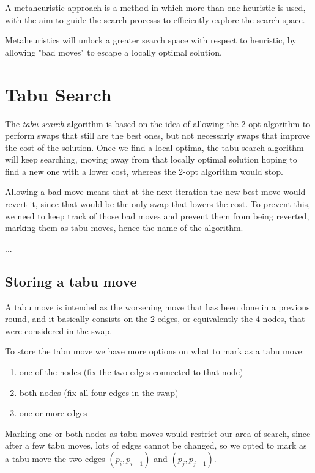 A metaheuristic approach is a method in which more than one heuristic is used, with the aim to guide the search processs to efficiently explore the search space.

Metaheuristics will unlock a greater search space with respect to heuristic, by allowing "bad moves" to escape a locally optimal solution.

\section{Tabu Search}
The \textit{tabu search} algorithm \cite{glover_tabu} is based on the idea of allowing the 2-opt algorithm to perform swaps that still are the best ones, but not necessarly swaps that improve the cost of the solution. Once we find a local optima, the tabu search algorithm will keep searching, moving away from that locally optimal solution hoping to find a new one with a lower cost, whereas the 2-opt algorithm would stop.

Allowing a bad move means that at the next iteration the new best move would revert it, since that would be the only swap that lowers the cost. To prevent this, we need to keep track of those bad moves and prevent them from being reverted, marking them as tabu moves, hence the name of the algorithm.

...
\subsection{Storing a tabu move}

A tabu move is intended as the worsening move that has been done in a previous round, and it basically consists on the 2 edges, or equivalently the 4 nodes, that were considered in the swap.

To store the tabu move we have more options on what to mark as a tabu move:

\begin{enumerate}
    \item one of the nodes (fix the two edges connected to that node)
    \item both nodes (fix all four edges in the swap)
    \item one or more edges
\end{enumerate}

Marking one or both nodes as tabu moves would restrict our area of search, since after a few tabu moves, lots of edges cannot be changed, so we opted to mark as a tabu move the two edges $(p_{i},p_{i+1})$ and $(p_{j}, p_{j+1})$.

